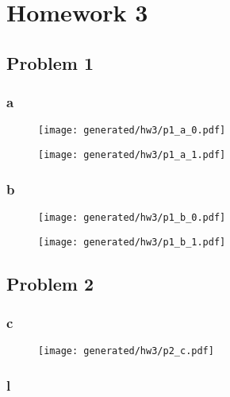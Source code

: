 \chapter{Homework 3}

\section{Problem 1}

\subsection{a}

\begin{figure}[H]
    \centering
    \texttt{[image: generated/hw3/p1\_a\_0.pdf]}
\end{figure}

\begin{figure}[H]
    \centering
    \texttt{[image: generated/hw3/p1\_a\_1.pdf]}
\end{figure}

\subsection{b}

\begin{figure}[H]
    \centering
    \texttt{[image: generated/hw3/p1\_b\_0.pdf]}
\end{figure}

\begin{figure}[H]
    \centering
    \texttt{[image: generated/hw3/p1\_b\_1.pdf]}
\end{figure}

\section{Problem 2}

\subsection{c}

\begin{figure}[H]
    \centering
    \texttt{[image: generated/hw3/p2\_c.pdf]}
\end{figure}

\subsection{l}

